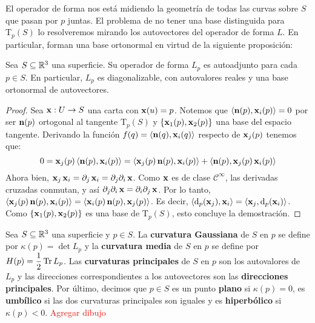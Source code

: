 El operador de forma nos está midiendo la geometría de todas las curvas sobre $S$ que pasan por $p$ juntas. El problema de no tener una base distinguida para $\mathrm{T}_p(S)$ lo resolveremos mirando los autovectores del operador de forma $L$. En particular, forman una base ortonormal en virtud de la siguiente proposición:

\begin{prop}
Sea $S\subseteq\RR^3$ una superficie. Su operador de forma $L_p$ es autoadjunto para cada $p\in S$. En particular, $L_p$ es diagonalizable, con autovalores reales y una base ortonormal de autovectores.
\begin{proof}
Sea $\x:U\to S$ una carta con $\x(u)=p$. Notemos que $\pint{\n(p),\x_i(p)}=0$ por ser $\n(p)$ ortogonal al tangente $\mathrm{T}_p(S)$ y $\{\x_1(p),\x_2(p)\}$ una base del espacio tangente. Derivando la función $f(q)=\pint{\n(q),\x_i(q)}$ respecto de $\x_j(p)$ tenemos que: $$0 = \x_j(p)\pint{\n(p),\x_i(p)} = \pint{\x_j(p)\n(p),\x_i(p)} + \pint{\n(p),\x_j(p)\x_i(p)}$$ Ahora bien, $\x_j\x_i=\partial_j\x_i=\partial_j\partial_i\x$. Como $\x$ es de clase $\mathscr{C}^\infty$, las derivadas cruzadas conmutan, y así $\partial_j\partial_i\x = \partial_i\partial_j\x$. Por lo tanto, $\pint{\x_j(p)\n(p),\x_i(p)} = \pint{\x_i(p)\n(p),\x_j(p)}$. Es decir, $\pint{\diff_p(\x_j),\x_i} = \pint{\x_j,\diff_p(\x_i)}$. Como $\{\x_1(p),\x_2(p)\}$ es una base de $\mathrm{T}_p(S)$, esto concluye la demostración.
\end{proof}
\end{prop}

\begin{defn}
Sea $S\subseteq\RR^3$ una superficie y $p\in S$. La \textbf{curvatura Gaussiana} de $S$ en $p$ se define por $\kappa(p)=\det L_p$ y la \textbf{curvatura media} de $S$ en $p$ se define por $H(p)=\dfrac{1}{2}\tr L_p$. Las \textbf{curvaturas principales} de $S$ en $p$ son los autovalores de $L_p$ y las direcciones correspondientes a los autovectores son las \textbf{direcciones principales}. Por último, decimos que $p\in S$ es un punto \textbf{plano} si $\kappa(p)=0$, es \textbf{umbílico} si las dos curvaturas principales son iguales y es \textbf{hiperbólico} si $\kappa(p)<0$. \textcolor{red}{Agregar dibujo}
\end{defn}